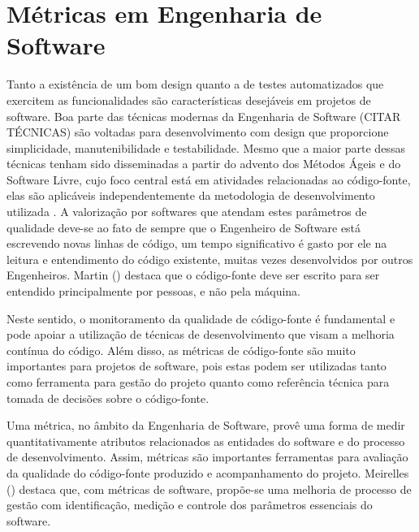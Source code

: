
\section{Métricas em Engenharia de Software}
\label{sec-metrics-esw} 
Tanto a existência de um bom design quanto a de testes automatizados que exercitem as funcionalidades são características desejáveis em projetos de software.	Boa parte das técnicas modernas da Engenharia de Software (CITAR TÉCNICAS) são voltadas para desenvolvimento com design que proporcione simplicidade, manutenibilidade e testabilidade. Mesmo que a maior parte dessas técnicas tenham sido disseminadas a partir do advento dos Métodos Ágeis e do Software Livre, cujo foco central está em atividades relacionadas ao código-fonte, elas são aplicáveis independentemente da metodologia de desenvolvimento utilizada \cite{meirelles2013metrics}. A valorização por softwares que atendam estes parâmetros de qualidade deve-se ao fato de sempre que o Engenheiro de Software está escrevendo novas linhas de código, um tempo significativo é gasto por ele na leitura e entendimento do código existente, muitas vezes desenvolvidos por outros Engenheiros. Martin (\citeyear{martin2008}) destaca que o código-fonte deve ser escrito para ser entendido principalmente por pessoas, e não pela máquina.

%

Neste sentido, o monitoramento da qualidade de código-fonte é fundamental e pode apoiar a utilização de técnicas de desenvolvimento que visam a melhoria contínua do código. Além disso, as métricas de código-fonte são muito importantes para projetos de software, pois estas podem ser utilizadas tanto como ferramenta para gestão do projeto quanto como referência técnica para tomada de decisões sobre o código-fonte.

%

Uma métrica, no âmbito da Engenharia de Software, provê uma forma de medir quantitativamente atributos relacionados as entidades do software e do processo de desenvolvimento. Assim, métricas são importantes ferramentas para avaliação da qualidade do código-fonte produzido e acompanhamento do projeto. Meirelles (\citeyear{meirelles2013metrics}) destaca que, com métricas de software, propõe-se uma melhoria de processo de gestão com identificação, medição e controle dos parâmetros essenciais do software.

%

